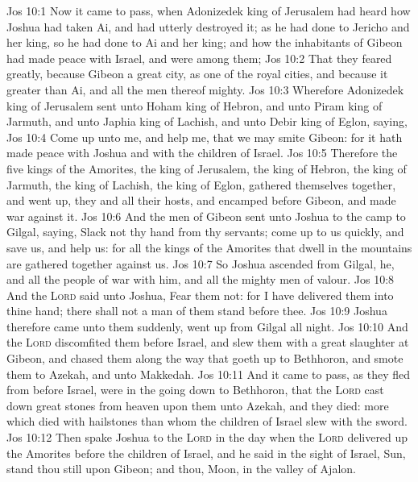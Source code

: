 \vs Jos 10:1 Now it came to pass, when Adonizedek king of Jerusalem had heard how Joshua had taken Ai, and had utterly destroyed it; as he had done to Jericho and her king, so he had done to Ai and her king; and how the inhabitants of Gibeon had made peace with Israel, and were among them;
\vs Jos 10:2 That they feared greatly, because Gibeon  a great city, as one of the royal cities, and because it  greater than Ai, and all the men thereof  mighty.
\vs Jos 10:3 Wherefore Adonizedek king of Jerusalem sent unto Hoham king of Hebron, and unto Piram king of Jarmuth, and unto Japhia king of Lachish, and unto Debir king of Eglon, saying,
\vs Jos 10:4 Come up unto me, and help me, that we may smite Gibeon: for it hath made peace with Joshua and with the children of Israel.
\vs Jos 10:5 Therefore the five kings of the Amorites, the king of Jerusalem, the king of Hebron, the king of Jarmuth, the king of Lachish, the king of Eglon, gathered themselves together, and went up, they and all their hosts, and encamped before Gibeon, and made war against it.
\vs Jos 10:6 And the men of Gibeon sent unto Joshua to the camp to Gilgal, saying, Slack not thy hand from thy servants; come up to us quickly, and save us, and help us: for all the kings of the Amorites that dwell in the mountains are gathered together against us.
\vs Jos 10:7 So Joshua ascended from Gilgal, he, and all the people of war with him, and all the mighty men of valour.
\vs Jos 10:8 And the \textsc{Lord} said unto Joshua, Fear them not: for I have delivered them into thine hand; there shall not a man of them stand before thee.
\vs Jos 10:9 Joshua therefore came unto them suddenly,  went up from Gilgal all night.
\vs Jos 10:10 And the \textsc{Lord} discomfited them before Israel, and slew them with a great slaughter at Gibeon, and chased them along the way that goeth up to Bethhoron, and smote them to Azekah, and unto Makkedah.
\vs Jos 10:11 And it came to pass, as they fled from before Israel,  were in the going down to Bethhoron, that the \textsc{Lord} cast down great stones from heaven upon them unto Azekah, and they died:  more which died with hailstones than  whom the children of Israel slew with the sword.
\vs Jos 10:12 Then spake Joshua to the \textsc{Lord} in the day when the \textsc{Lord} delivered up the Amorites before the children of Israel, and he said in the sight of Israel, Sun, stand thou still upon Gibeon; and thou, Moon, in the valley of Ajalon.
